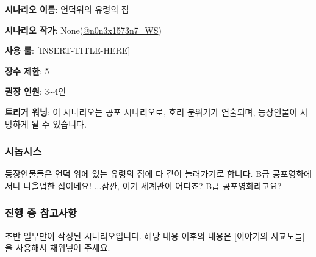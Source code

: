 \documentclass{report}
\begin{document}
	\textbf{시나리오 이름}: 언덕위의 유령의 집
	
	\textbf{시나리오 작가}: None(\href{https://www.twitter.com/n0n3x1573n7_WS}{@n0n3x1573n7\_WS})
	
	\textbf{사용 룰}: [INSERT-TITLE-HERE]
	
	\textbf{장수 제한}: 5
	
	\textbf{권장 인원}: 3\textasciitilde 4인
	
	\textbf{트리거 워닝}: 이 시나리오는 공포 시나리오로, 호러 분위기가 연출되며, 등장인물이 사망하게 될 수 있습니다.
	
	\subsubsection*{시놉시스}
	
	등장인물들은 언덕 위에 있는 유령의 집에 다 같이 놀러가기로 합니다. B급 공포영화에서나 나올법한 집이네요! ...잠깐, 이거 세계관이 어디죠? B급 공포영화라고요?
	
	\subsubsection*{진행 중 참고사항}
	초반 일부만이 작성된 시나리오입니다. 해당 내용 이후의 내용은 [이야기의 사교도들]을 사용해서 채워넣어 주세요.
	
\end{document}
